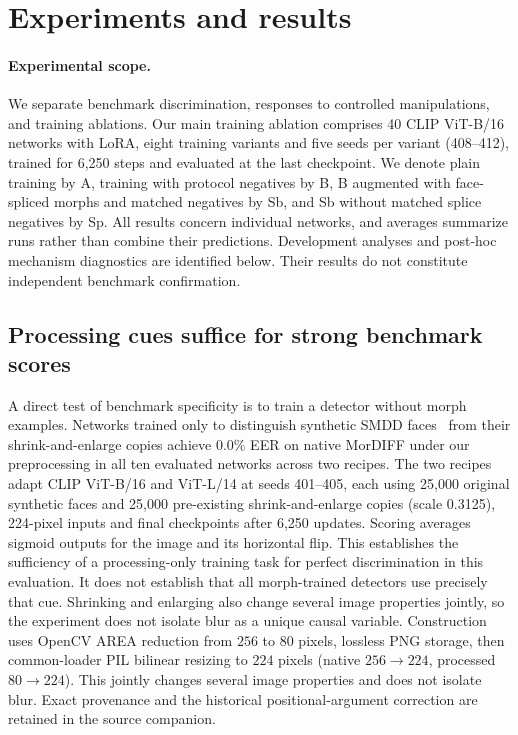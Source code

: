     \section{Experiments and results}
    \label{sec:results}
    
    \paragraph{Experimental scope.}
    We separate benchmark discrimination, responses to controlled manipulations, and training ablations. Our main training ablation comprises 40 CLIP ViT-B/16 networks with LoRA, eight training variants and five seeds per variant (408--412), trained for 6,250 steps and evaluated at the last checkpoint. We denote plain training by A, training with protocol negatives by B, B augmented with face-spliced morphs and matched negatives by Sb, and Sb without matched splice negatives by Sp. All results concern individual networks, and averages summarize runs rather than combine their predictions. Development analyses and post-hoc mechanism diagnostics are identified below. Their results do not constitute independent benchmark confirmation.
    
    \subsection{Processing cues suffice for strong benchmark scores}
    \label{sec:artifact_results}
    A direct test of benchmark specificity is to train a detector without morph examples. Networks trained only to distinguish synthetic SMDD faces~\cite{damer2022smdd} from their shrink-and-enlarge copies achieve 0.0\% EER on native MorDIFF under our preprocessing in all ten evaluated networks across two recipes. The two recipes adapt CLIP ViT-B/16 and ViT-L/14 at seeds 401--405, each using 25,000 original synthetic faces and 25,000 pre-existing shrink-and-enlarge copies (scale 0.3125), 224-pixel inputs and final checkpoints after 6,250 updates. Scoring averages sigmoid outputs for the image and its horizontal flip. This establishes the sufficiency of a processing-only training task for perfect discrimination in this evaluation. It does not establish that all morph-trained detectors use precisely that cue. Shrinking and enlarging also change several image properties jointly, so the experiment does not isolate blur as a unique causal variable.
    Construction uses OpenCV AREA reduction from $256$ to $80$ pixels, lossless PNG storage, then common-loader PIL bilinear resizing to $224$ pixels (native $256\to224$, processed $80\to224$). This jointly changes several image properties and does not isolate blur. Exact provenance and the historical positional-argument correction are retained in the source companion.
    
